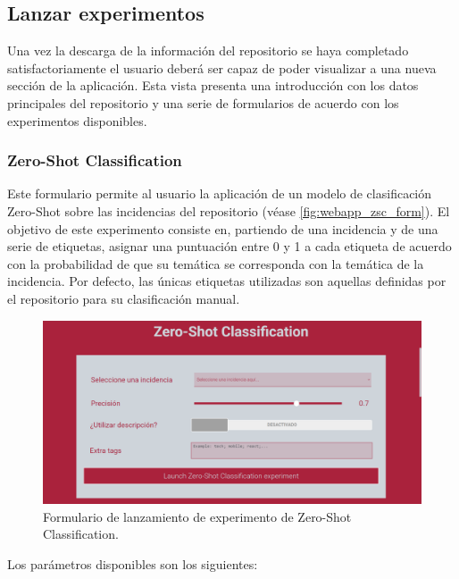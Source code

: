 \subsection{Lanzar experimentos}

Una vez la descarga de la información del repositorio se haya completado satisfactoriamente el usuario deberá ser capaz de poder visualizar a una nueva sección de la aplicación. Esta vista presenta una introducción con los datos principales del repositorio y una serie de formularios de acuerdo con los experimentos disponibles.

\subsubsection{Zero-Shot Classification}

Este formulario permite al usuario la aplicación de un modelo de clasificación Zero-Shot sobre las incidencias del repositorio (véase \autoref{fig:webapp_zsc_form}). El objetivo de este experimento consiste en, partiendo de una incidencia y de una serie de etiquetas, asignar una puntuación entre 0 y 1 a cada etiqueta de acuerdo con la probabilidad de que su temática se corresponda con la temática de la incidencia. Por defecto, las únicas etiquetas utilizadas son aquellas definidas por el repositorio para su clasificación manual.

\begin{figure}[!ht]
	\centering
    \includegraphics[width=\textwidth]{img/webapp_zsc_form.png}
	\caption{Formulario de lanzamiento de experimento de Zero-Shot Classification.}
	\label{fig:webapp_zsc_form}
\end{figure}

Los parámetros disponibles son los siguientes: 

